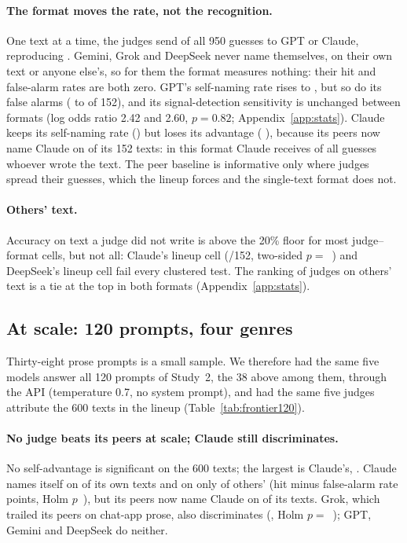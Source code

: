 \paragraph{The format moves the rate, not the recognition.} One text at a
time, the judges send \SingleConcentration{} of all 950 guesses to GPT or
Claude, reproducing \citet{bai2025selfrecognition}. Gemini, Grok and DeepSeek
never name themselves, on their own text or anyone else's, so for them the
format measures nothing: their hit and false-alarm rates are both zero. GPT's
self-naming rate rises to \GPTSelfSingle{}, but so do its false alarms
(\GPTFALineupK{} to \GPTFASingleK{} of 152), and its signal-detection
sensitivity is unchanged between formats (log odds ratio 2.42 and 2.60,
$p=0.82$; Appendix~\ref{app:stats}). Claude keeps its self-naming rate
(\ClaudeSelfSingle{}) but loses its advantage (\ClaudeAdvSingle{}
\ClaudeAdvSingleCI{}), because its peers now name Claude on
\ClaudePeerSingleK{} of its 152 texts: in this format Claude receives
\ClaudeBlameSingle{} of all guesses whoever wrote the text. The peer baseline
is informative only where judges spread their guesses, which the lineup
forces and the single-text format does not.

\paragraph{Others' text.} Accuracy on text a judge did not write is above
the 20\% floor for most judge--format cells, but not all: Claude's lineup
cell (\ClaudeNonSelfLineupK{}/152, two-sided $p=$~\ClaudeNonSelfLineupP{})
and DeepSeek's lineup cell fail every clustered test. The ranking of judges
on others' text is a tie at the top in both formats (Appendix~\ref{app:stats}).

\subsection{At scale: 120 prompts, four genres}
\label{sec:frontier120}


Thirty-eight prose prompts is a small sample. We therefore had the same five
models answer all 120 prompts of Study~2, the 38 above among them, through
the API (temperature 0.7, no system prompt), and had the same five judges
attribute the 600 texts in the lineup (Table~\ref{tab:frontier120}).
\FXSingleSentence{}

\paragraph{No judge beats its peers at scale; Claude still discriminates.}
No self-advantage is significant on the 600 texts; the largest is Claude's,
\FXClaudeLineupAdv{} \FXClaudeLineupAdvCI{}. Claude names itself on
\FXClaudeLineupSelf{} of its own texts and on only \FXClaudeLineupFA{} of
others' (hit minus false-alarm rate \FXClaudeLineupDisc{} points, Holm
$p$~\FXClaudeLineupDiscHolm{}), but its peers now name Claude on
\FXClaudeLineupPeer{} of its texts. Grok, which trailed its peers on
chat-app prose, also discriminates (\FXGrokLineupDisc{}, Holm
$p=$~\FXGrokLineupDiscHolm{}); GPT, Gemini and DeepSeek do neither.

